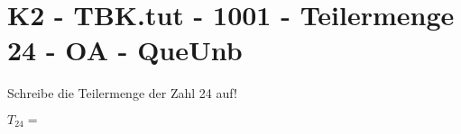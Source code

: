 \section{K2 - TBK.tut - 1001 - Teilermenge 24 - OA - QueUnb}

\begin{beispiel}{1} %
				Schreibe die Teilermenge der Zahl 24 auf!\leer
				
				$T_{24}=$ 
\end{beispiel}